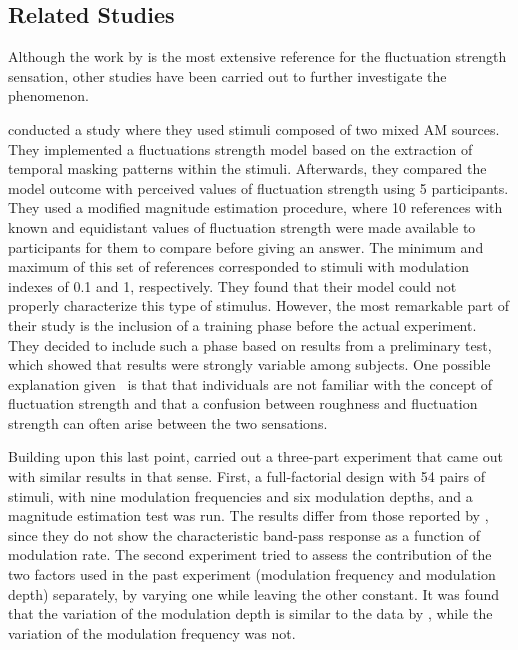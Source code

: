 \documentclass[../main.tex]{subfiles}
\begin{document}
\begin{theoreticalbackground}
\subsection{Related Studies}

Although the work by \citeauthor{Fastl2007Psychoacoustics} is the most extensive
reference for the fluctuation strength sensation, other studies have been
carried out to further investigate the phenomenon.

\textcite{Accolti2009Fluctuation} conducted a study where they used stimuli
composed of two mixed \gls{AM} sources. They implemented a fluctuations strength
model based on the extraction of temporal masking patterns within the stimuli.
Afterwards, they compared the model outcome with perceived values of
fluctuation strength using 5 participants. They used a modified magnitude
estimation procedure, where 10 references with known and equidistant values of
fluctuation strength were made available to participants for them to compare
before giving an answer. The minimum and maximum of this set of references
corresponded to stimuli with modulation indexes of 0.1 and 1, respectively. They
found that their model could not properly characterize this type of stimulus.
However, the most remarkable part of their study is the inclusion of a training
phase before the actual experiment. They decided to include such a phase based
on results from a preliminary test, which showed that results were strongly
variable among subjects. One possible explanation
given~\cite[pp.~17]{Accolti2009Fluctuation} is that that individuals are not
familiar with the concept of fluctuation strength and that a confusion between
roughness and fluctuation strength can often arise between the two sensations.

Building upon this last point, \citeauthor{Wickelmaier2004Scaling} carried out
a three-part experiment that came out with similar results in that sense. First,
a full-factorial design with 54 pairs of stimuli, with nine modulation
frequencies and six modulation depths, and a magnitude estimation test was run.
The results differ from those reported by \citeauthor{Fastl2007Psychoacoustics},
since they do not show the characteristic band-pass response as a function of
modulation rate. The second experiment tried to assess the contribution of the
two factors used in the past experiment (modulation frequency and modulation
depth) separately, by varying one while leaving the other constant. It was found
that the variation of the modulation depth is similar to the data by
\citeauthor{Fastl2007Psychoacoustics}, while the variation of the modulation
frequency was not.


\end{theoreticalbackground}
\end{document}
